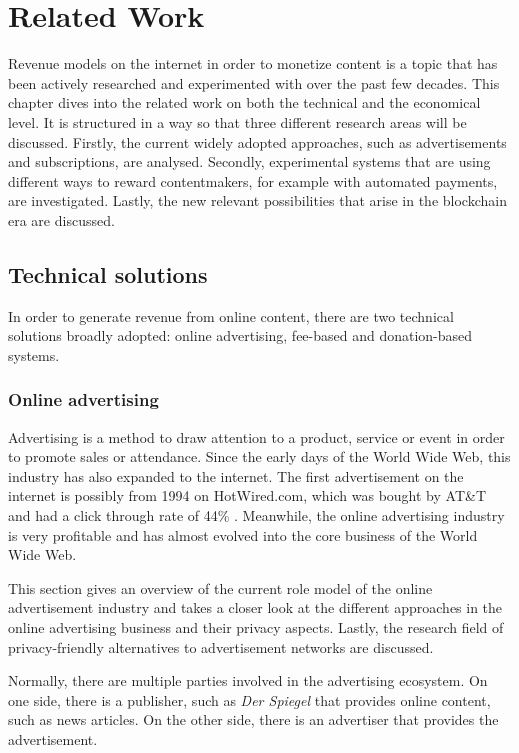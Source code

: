 \chapter{Related Work}
\label{cha:relatedwork}

Revenue models on the internet in order to monetize content is a topic that has been actively researched and experimented with over the past few decades. This chapter dives into the related work on both the technical and the economical level. It is structured in a way so that three different research areas will be discussed.
Firstly, the current widely adopted approaches, such as advertisements and subscriptions, are analysed. Secondly, experimental systems that are using different ways to reward contentmakers, for example with automated payments, are investigated. Lastly, the new relevant possibilities that arise in the blockchain era are discussed.


\section{Technical solutions}

In order to generate revenue from online content, there are two technical solutions broadly adopted: online advertising, fee-based and donation-based systems.

\subsection{Online advertising}
Advertising is a method to draw attention to a product, service or event in order to promote sales or attendance. Since the early days of the World Wide Web, this industry has also expanded to the internet. The first advertisement on the internet is possibly from 1994 on HotWired.com, which was bought by AT\&T and had a click through rate of 44\% \cite{firstbanner}. Meanwhile, the online advertising industry is very profitable and has almost evolved into the core business of the World Wide Web.

This section gives an overview of the current role model of the online advertisement industry and takes a closer look at the different approaches in the online advertising business and their privacy aspects. Lastly, the research field of privacy-friendly alternatives to advertisement networks are discussed. 

Normally, there are multiple parties involved in the advertising ecosystem. On one side, there is a publisher, such as \textit{Der Spiegel} that provides online content, such as news articles. On the other side, there is an advertiser that provides the advertisement.

